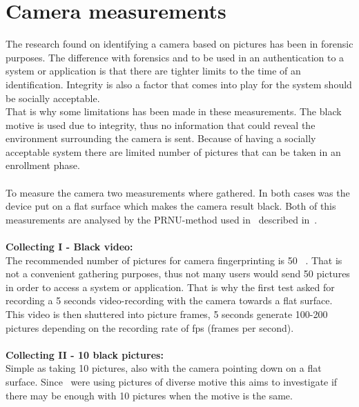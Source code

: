 \section{Camera measurements}\label{sec:measurement:camera}
The research found on identifying a camera based on pictures has been in forensic purposes. The difference with forensics and to be used in an authentication to a system or application is that there are tighter limits to the time of an identification. Integrity is also a factor that comes into play for the system should be socially acceptable. \\
That is why some limitations has been made in these measurements. The black motive is used due to integrity, thus no information that could reveal the environment surrounding the camera is sent. Because of having a socially acceptable system there are limited number of pictures that can be taken in an enrollment phase.\\
\\
To measure the camera two measurements where gathered. In both cases was the device put on a flat surface which makes the camera result black. Both of this measurements are analysed by the PRNU-method used in~\cite[]{sensor:camera:DCIdent} described in~.\\
\\
\textbf{Collecting I - Black video:}\\ 
The recommended number of pictures for camera fingerprinting is 50 ~\cite[]{sensor:camera:DCIdent}. That is not a convenient gathering purposes, thus not many users would send 50 pictures in order to access a system or application. That is why the first test asked for recording a 5 seconds video-recording with the camera towards a flat surface. This video is then shuttered into picture frames, 5 seconds generate 100-200 pictures depending on the recording rate of fps (frames per second).\\
\\
\textbf{Collecting II - 10 black pictures:} \\
Simple as taking 10 pictures, also with the camera pointing down on a flat surface. Since~\cite[]{sensor:camera:DCIdent} were using pictures of diverse motive this aims to investigate if there may be enough with 10 pictures when the motive is the same.

